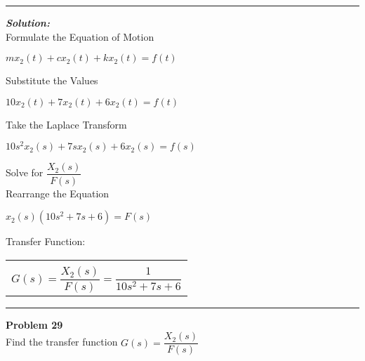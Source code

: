 \documentclass[11pt,letterpaper]{article}
\begin{document}
	\rule{\textwidth}{1pt}
\vspace{12pt}
\textit{\textbf{Solution:}}\\
Formulate the Equation of Motion\\
\begin{center}
	$mx_2(t)+cx_2(t)+kx_2(t)=f(t)$\\
\end{center}
Substitute the Values\\
\begin{center}
	$10x_2(t)+7x_2(t)+6x_2(t)=f(t)$\\
\end{center}
Take the Laplace Transform\\
\begin{center}
	$10s^2x_2(s)+7sx_2(s)+6x_2(s)=f(s)$\\
\end{center}
Solve for $\dfrac{X_2(s)}{F(s)}$\\[12pt]
Rearrange the Equation\\
\begin{center}
	$x_2(s)(10s^2+7s+6)=F(s)$\\
\end{center}
Transfer Function:\\
\begin{center}
	\begin{tabular}{|c|}
		\hline \\
		$G(s)=\dfrac{X_2(s)}{F(s)}=\dfrac{1}{10s^2+7s+6}$	\\ [12pt]
	\hline
	\end{tabular}	
\end{center}

\clearpage

\rule{\textwidth}{1pt}
\textbf{Problem 29}\\
Find the transfer function $G(s)=\dfrac{X_2(s)}{F(s)}$\\
\end{document}
